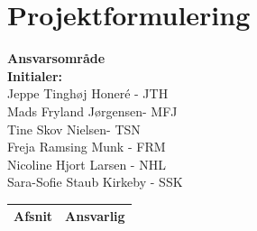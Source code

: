 \chapter{Projektformulering}




\textbf{Ansvarsområde} \\
\textbf{Initialer: } \\
Jeppe Tinghøj Honeré - JTH \\
Mads Fryland Jørgensen- MFJ \\
Tine Skov Nielsen- TSN \\
Freja Ramsing Munk - FRM \\
Nicoline Hjort Larsen - NHL \\
Sara-Sofie Staub Kirkeby - SSK \\[2ex]


\begin{longtabu} to 
    Afsnit &    Ansvarlig\\[-1ex]
    \midrule
     
    
    

\end{longtabu}

